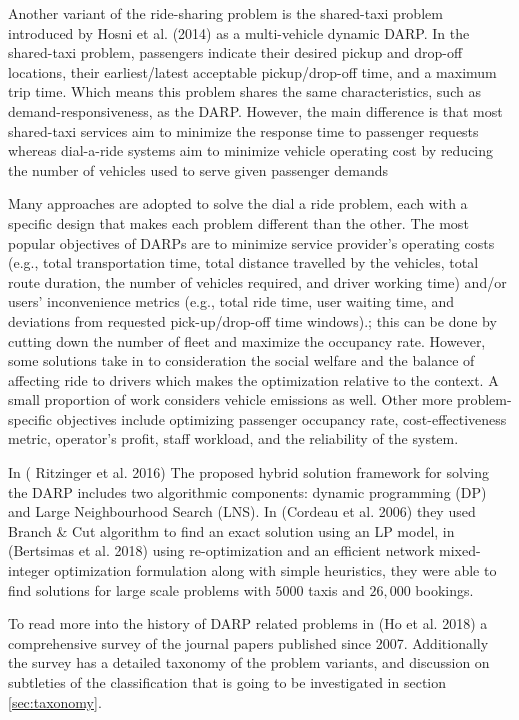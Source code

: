 \documentclass{article}
\begin{document}
Another variant of the ride-sharing problem is the shared-taxi problem introduced by Hosni et al. (2014) as a multi-vehicle dynamic DARP. In the shared-taxi problem, passengers indicate their desired pickup and
drop-off locations, their earliest/latest acceptable pickup/drop-off time, and a maximum trip time. Which means this problem shares the same characteristics, such as demand-responsiveness, as the DARP. 
However, the main difference is that most shared-taxi services aim to minimize the response time to passenger requests whereas dial-a-ride systems aim to minimize vehicle operating cost by reducing
the number of vehicles used to serve given passenger demands

Many approaches are adopted to solve the dial a ride problem, each with a specific design that makes each problem different than the other. The most popular objectives of DARPs are to minimize service provider’s operating costs (e.g., total transportation time, total distance travelled by the vehicles, total route duration, the number of vehicles required, and driver working time) and/or users’ inconvenience metrics (e.g., total ride time, user waiting time, and deviations from requested pick-up/drop-off time windows).; this can be done by cutting down the number of fleet and maximize the occupancy rate. However, some solutions take in to consideration the social welfare and the balance of affecting ride to drivers which makes the optimization relative to the context. A small proportion of work considers vehicle emissions as well. Other more problem-specific objectives include optimizing passenger occupancy rate, cost-effectiveness metric, operator’s profit, staff workload, and the reliability of the system.

In ( Ritzinger et al. 2016)\cite{Ritzinger_Puchinger2016} The proposed hybrid solution framework for solving the DARP includes two algorithmic components: dynamic programming (DP) and Large Neighbourhood Search (LNS). In (Cordeau et al. 2006)\cite{Cordeau2006} they used Branch \& Cut algorithm to find an exact solution using an LP model, in (Bertsimas et al. 2018)\cite{Bertsimas2018} using re-optimization and an efficient network mixed-integer optimization formulation along with simple heuristics, they were able to find solutions for large scale problems with $5000$ taxis and $26,000$ bookings. 

To read more into the history of DARP related problems in (Ho et al. 2018) \cite{HO_darp2018} a comprehensive survey of the journal papers published since 2007. Additionally the survey has a detailed taxonomy of the problem variants, and discussion on subtleties of the classification that is going to be investigated in section \ref{sec:taxonomy}. 
\end{document}
